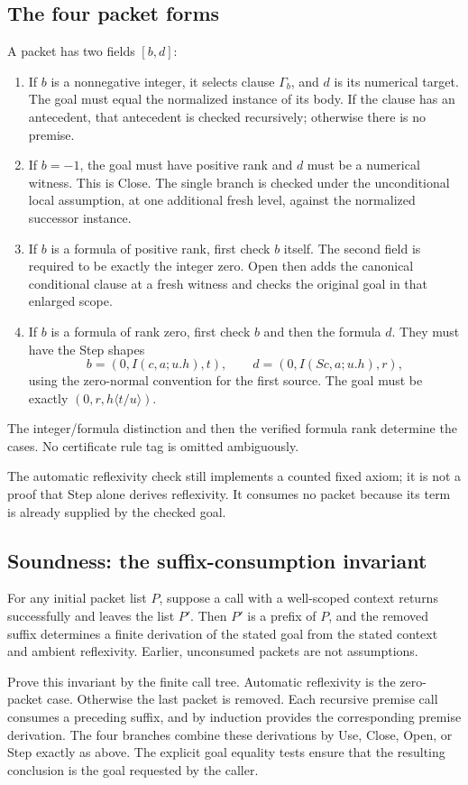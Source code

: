 \subsection{The four packet forms}
A packet has two fields \([b,d]\):
\begin{enumerate}
\item If \(b\) is a nonnegative integer, it selects clause \(\Gamma_b\),
and \(d\) is its numerical target. The goal must equal the normalized
instance of its body. If the clause has an antecedent, that antecedent
is checked recursively; otherwise there is no premise.
\item If \(b=-1\), the goal must have positive rank and \(d\) must be
a numerical witness. This is Close. The single branch is checked under
the unconditional local assumption, at one additional fresh level,
against the normalized successor instance.
\item If \(b\) is a formula of positive rank, first check \(b\) itself.
The second field is required to be exactly the integer zero. Open then
adds the canonical conditional clause at a fresh witness and checks
the original goal in that enlarged scope.
\item If \(b\) is a formula of rank zero, first check \(b\) and then
the formula \(d\). They must have the Step shapes
\[
 b=(0,I(c,a;u.h),t),\qquad
 d=(0,I(Sc,a;u.h),r),
\]
using the zero-normal convention for the first source.
The goal must be exactly \((0,r,h\langle t/u\rangle)\).
\end{enumerate}
The integer/formula distinction and then the verified formula rank
determine the cases. No certificate rule tag is omitted ambiguously.

The automatic reflexivity check still implements a counted fixed axiom;
it is not a proof that Step alone derives reflexivity. It consumes no
packet because its term is already supplied by the checked goal.

\subsection{Soundness: the suffix-consumption invariant}
For any initial packet list \(P\), suppose a call with a well-scoped
context returns successfully and leaves the list \(P'\).
Then \(P'\) is a prefix of \(P\), and the removed suffix determines a
finite derivation of the stated goal from the stated context and
ambient reflexivity. Earlier, unconsumed packets are not assumptions.

Prove this invariant by the finite call tree. Automatic reflexivity is
the zero-packet case. Otherwise the last packet is removed. Each
recursive premise call consumes a preceding suffix, and by induction
provides the corresponding premise derivation. The four branches
combine these derivations by Use, Close, Open, or Step exactly as above.
The explicit goal equality tests ensure that the resulting conclusion
is the goal requested by the caller.


